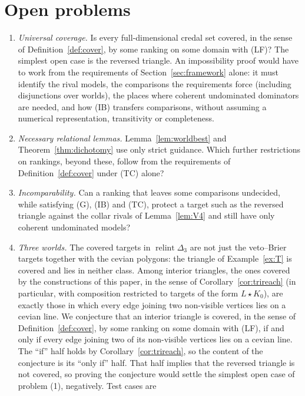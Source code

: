\documentclass[11pt]{article}
\DeclareMathOperator{\relint}{relint}
\theoremstyle{plain}
\theoremstyle{definition}
\theoremstyle{remark}
\begin{document}
\section{Open problems}\label{sec:open}

\begin{enumerate}[label=(\arabic*)]
  \item \emph{Universal coverage.} Is every full-dimensional credal set covered, in the
  sense of Definition~\ref{def:cover}, by some ranking on some domain with (LF)? The
  simplest open case is the reversed triangle. An impossibility proof would have to work
  from the requirements of Section~\ref{sec:framework} alone: it must identify the rival
  models, the comparisons the requirements force (including disjunctions over worlds), the
  places where coherent undominated dominators are needed, and how (IB) transfers
  comparisons, without assuming a numerical representation, transitivity or completeness.
  \item \emph{Necessary relational lemmas.} Lemma~\ref{lem:worldbest} and
  Theorem~\ref{thm:dichotomy} use only strict guidance. Which further restrictions on
  rankings, beyond these, follow from the requirements of Definition~\ref{def:cover}
  under (TC) alone?
  \item \emph{Incomparability.} Can a ranking that leaves some comparisons undecided, while
  satisfying (G), (IB) and (TC), protect a target such as the reversed triangle against
  the collar rivals of Lemma~\ref{lem:V4} and still have only coherent undominated models?
  \item \emph{Three worlds.} The covered targets in $\relint\Delta_3$ are not just the
  veto--Brier targets together with the cevian polygons: the triangle of
  Example~\ref{ex:T} is covered and lies in neither class. Among interior triangles, the
  ones covered by the constructions of this paper, in the sense of
  Corollary~\ref{cor:trireach} (in particular, with composition restricted to targets of
  the form $L\star K_0$), are exactly those in which every edge joining two non-visible
  vertices lies on a cevian line.
  We conjecture that an interior triangle is covered, in the sense of
  Definition~\ref{def:cover}, by some ranking on some domain with (LF), if and only if
  every edge joining two of its non-visible vertices lies on a cevian line. The ``if''
  half holds by Corollary~\ref{cor:trireach}, so the content of the conjecture is its
  ``only if'' half. That half implies that the reversed triangle is not covered, so proving
  the conjecture would settle the simplest open case of problem (1), negatively. Test cases are

\end{enumerate}
\end{document}
